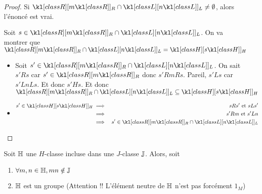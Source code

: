 \begin{proof}
	Si $\classr m \cap \classl n \neq \emptyset$, alors l'énoncé est vrai.

	Soit $s \in \classr m \cap \classl n$. On va montrer que $\classr m \cap \classl n = \classh s$

	\begin{itemize}
		\item Soit $s' \in \classr m \cap \classl n$. On sait $s' R s$ car $s' \in \classr m$ donc $s' R m R s$.
		      Pareil, $s' L s$ car  $s' L n L s$.
		      Et donc $s' H s$. Et donc $\classr m \cap \classl n \subseteq \classh s$

		\item \begin{eqnarray*}
			      s' \in \classh s &\implies& s R s' \et s L s'\\
			      &\implies& s' R m \et s' L n\\
			      &\implies& s' \in \classr m \cap \classl n
		      \end{eqnarray*}

	\end{itemize}
\end{proof}

\begin{lemma}
	Soit $\mathbb{H}$ une $H$-classe incluse dans une $J$-classe $\mathbb{J}$. Alors, soit
	\begin{enumerate}
		\item $\forall m,n \in \mathbb{H}, mn \notin \mathbb{J}$ \label{lem:not-group}
		\item $\mathbb{H}$ est un groupe (Attention !! L'élément neutre de $\mathbb{H}$ n'est pas forcément $1_M$)
	\end{enumerate}
\end{lemma}

